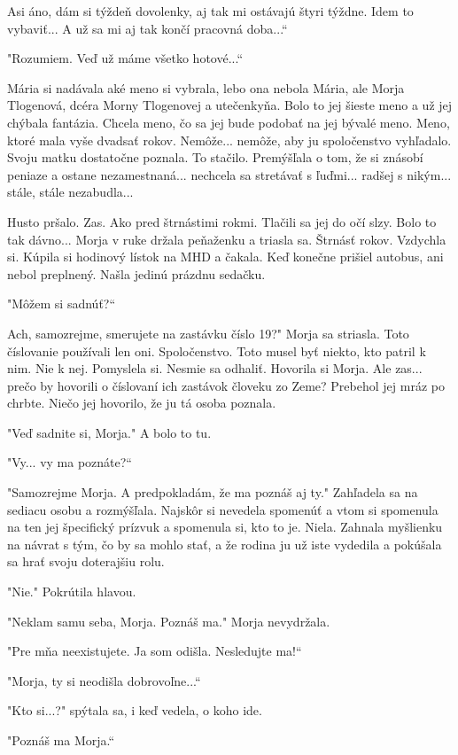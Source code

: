 \documentclass{book}
\begin{document}
$ $Asi áno, dám si týždeň dovolenky, aj tak mi ostávajú štyri týždne. Idem to vybaviť... A už sa mi aj tak končí pracovná doba...“

"Rozumiem. Veď už máme všetko hotové...“

Mária si nadávala aké meno si vybrala, lebo ona nebola Mária, ale Morja Tlogenová, dcéra Morny Tlogenovej a utečenkyňa. Bolo to jej šieste meno a už jej chýbala fantázia. Chcela meno, čo sa jej bude podobať na jej bývalé meno. Meno, ktoré mala vyše dvadsať rokov. Nemôže... nemôže, aby ju spoločenstvo vyhľadalo. Svoju matku dostatočne poznala. To stačilo. Premýšľala o tom, že si znásobí peniaze a ostane nezamestnaná... nechcela sa stretávať s ľuďmi... radšej s nikým... stále, stále nezabudla...

Husto pršalo. Zas. Ako pred štrnástimi rokmi. Tlačili sa jej do očí slzy. Bolo to tak dávno... Morja v ruke držala peňaženku a triasla sa. Štrnásť rokov. Vzdychla si. Kúpila si hodinový lístok na MHD a čakala. Keď konečne prišiel autobus, ani nebol preplnený. Našla jedinú prázdnu sedačku.

"Môžem si sadnúť?“

$ $Ach, samozrejme, smerujete na zastávku číslo 19?"$ $ Morja sa striasla. Toto číslovanie používali len oni. Spoločenstvo. Toto musel byť niekto, kto patril k nim. Nie k nej. Pomyslela si. Nesmie sa odhaliť. Hovorila si Morja. Ale zas... prečo by hovorili o číslovaní ich zastávok človeku zo Zeme? Prebehol jej mráz po chrbte. Niečo jej hovorilo, že ju tá osoba poznala.

"Veď sadnite si, Morja."$ $ A bolo to tu.

"Vy... vy ma poznáte?“

"Samozrejme Morja. A predpokladám, že ma poznáš aj ty."$ $ Zahľadela sa na sediacu osobu a rozmýšľala. Najskôr si nevedela spomenúť a vtom si spomenula na ten jej špecifický prízvuk a spomenula si, kto to je. Niela. Zahnala myšlienku na návrat s tým, čo by sa mohlo stať, a že rodina ju už iste vydedila a pokúšala sa hrať svoju doterajšiu rolu.

"Nie."$ $ Pokrútila hlavou.

"Neklam samu seba, Morja. Poznáš ma."$ $ Morja nevydržala.

"Pre mňa neexistujete. Ja som odišla. Nesledujte ma!“

"Morja, ty si neodišla dobrovoľne...“

"Kto si...?"$ $ spýtala sa, i keď vedela, o koho ide.

"Poznáš ma Morja.“
\end{document}
